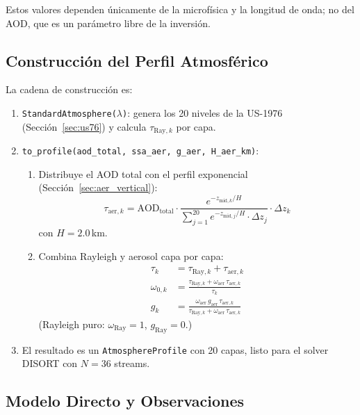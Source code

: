 \documentclass[a4paper,11pt]{article}
\begin{document}
Estos valores dependen \'unicamente de la microf\'isica y la longitud de onda;
no del AOD, que es un par\'ametro libre de la inversi\'on.

\subsection{Construcci\'on del Perfil Atmosf\'erico}

La cadena de construcci\'on es:
\begin{enumerate}
    \item \texttt{StandardAtmosphere($\lambda$)}: genera los 20 niveles de la
          US-1976 (Secci\'on~\ref{sec:us76}) y calcula $\tau_{\text{Ray},k}$
          por capa.

    \item \texttt{to\_profile(aod\_total, ssa\_aer, g\_aer, H\_aer\_km)}:
    \begin{enumerate}
        \item Distribuye el AOD total con el perfil exponencial
              (Secci\'on~\ref{sec:aer_vertical}):
              \[
                  \tau_{\text{aer},k} = \text{AOD}_{\text{total}}
                  \cdot \frac{e^{-z_{\text{mid},k}/H}}
                  {\sum_{j=1}^{20} e^{-z_{\text{mid},j}/H} \cdot \Delta z_j}
                  \cdot \Delta z_k
              \]
              con $H = 2.0$\,km.

        \item Combina Rayleigh y aerosol capa por capa:
              \begin{align*}
                  \tau_k &= \tau_{\text{Ray},k} + \tau_{\text{aer},k} \\
                  \omega_{0,k} &= \frac{\tau_{\text{Ray},k} + \omega_{\text{aer}}\,\tau_{\text{aer},k}}{\tau_k} \\
                  g_k &= \frac{\omega_{\text{aer}}\,g_{\text{aer}}\,\tau_{\text{aer},k}}{\tau_{\text{Ray},k} + \omega_{\text{aer}}\,\tau_{\text{aer},k}}
              \end{align*}
              (Rayleigh puro: $\omega_{\text{Ray}} = 1$, $g_{\text{Ray}} = 0$.)
    \end{enumerate}

    \item El resultado es un \texttt{AtmosphereProfile} con 20 capas, listo
          para el solver DISORT con $N = 36$ streams.
\end{enumerate}

\subsection{Modelo Directo y Observaciones}
\end{document}
